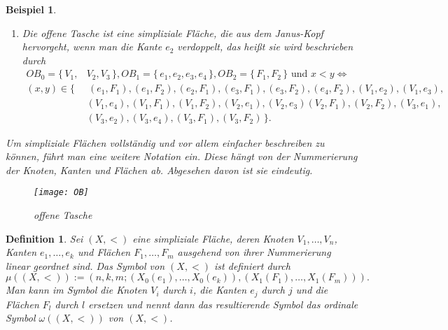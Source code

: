 \documentclass[12pt,titlepage,twoside,cleardoublepage]{article}
\theoremstyle{nummermitklammern}
\newtheorem{bsp}[temp]{Beispiel}
\newtheorem{definition}[temp]{Definition}
\newtheorem{definition}[zahl]{Definition}
\newtheorem{bsp}[zahl]{Beispiel}
\numberwithin{equation}{section}
\begin{document}
\begin{bsp}
\begin{enumerate}
\begin{figure}[H]
\begin{center}
\texttt{[image: JanusHead]}
\end{center}
\caption{Janus-Kopf}
\end{figure}
 \item 
 Die \emph{offene Tasche} ist eine simpliziale Fläche, die aus dem \emph{Janus-Kopf} hervorgeht, wenn man die Kante $e_{2}$ verdoppelt, das heißt sie wird beschrieben durch
 \begin{align*}
  OB_{0}=\{\,V_{1},&V_{2},V_{3}\,\},OB_{1}=\{\,e_{1},e_{2},e_{3},e_{4} \,\}, OB_{2}=\{\,F_{1},F_{2}\,\} \text{ und } x<y \Leftrightarrow\\
 (x,y)\in\{&\,(e_{1},F_{1}),(e_{1},F_{2}),(e_{2},F_{1}),(e_{3},F_{1}),(e_{3},F_{2}),(e_{4},F_{2}),(V_{1},e_{2}),(V_{1},e_{3}),\\ &(V_{1},e_{4}),
  (V_{1},F_{1}),(V_{1},F_{2}),(V_{2},e_{1}),(V_{2},e_{3})
 (V_{2},F_{1}), (V_{2},F_{2}), (V_{3},e_{1}),\\&(V_{3},e_{2}),(V_{3},e_{4}),(V_{3},F_{1}),(V_3,F_2) \,\}.
 \end{align*}
 \end{enumerate}
Um simpliziale Flächen vollständig und vor allem einfacher beschreiben zu können, führt man eine weitere Notation ein. Diese hängt von der Nummerierung der Knoten, Kanten und Flächen ab. Abgesehen davon ist sie eindeutig.
\begin{figure}[H]
\begin{center}
\texttt{[image: OB]}
\end{center}
\caption{offene Tasche}
\end{figure}
\end{bsp}
\begin{definition}
 Sei $(X,<)$ eine simpliziale Fläche, deren Knoten $V_{1},\ldots,V_{n}$, Kanten $e_{1},\ldots,e_{k}$ und Flächen $F_{1},\ldots,F_{m}$ ausgehend von ihrer Nummerierung linear geordnet sind. Das \emph{Symbol} von $(X,<)$ ist definiert durch 
\[
\mu((X,<)):=(n,k,m;(X_{0}(e_{1}),\ldots,X_{0}(e_{k})),(X_{1}(F_{1}),\ldots,X_{1}(F_{m}))).
\]
Man kann im Symbol die Knoten $V_{i}$ durch $i$, die Kanten $e_{j}$ durch $j$ und die Flächen $F_{l}$ durch $l$ ersetzen und nennt dann das resultierende Symbol das \emph{ordinale Symbol} $\omega((X,<))$ von $(X,<)$.
\end{definition}
\end{document}
